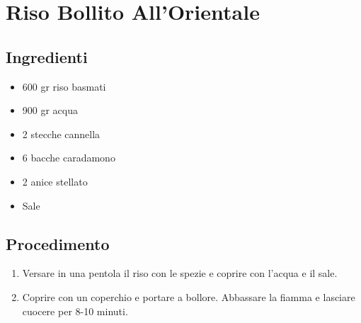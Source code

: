 \section{Riso Bollito All'Orientale}
\subsection{Ingredienti}
\begin{itemize}
\item 600 gr riso basmati  
\item 900 gr acqua  
\item 2 stecche cannella  
\item 6 bacche caradamono  
\item 2 anice stellato  
\item Sale
\end{itemize}
\subsection{Procedimento}
\begin{enumerate}
\item  Versare in una pentola il riso con le spezie e coprire con l'acqua e il sale.  
\item  Coprire con un coperchio e portare a bollore. Abbassare la fiamma e lasciare cuocere per 8-10 minuti.
\end{enumerate}
